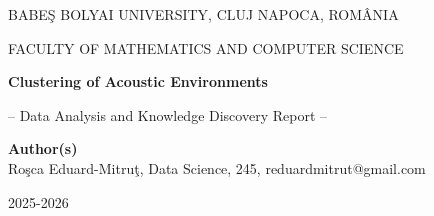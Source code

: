 \documentclass[runningheads,a4paper,11pt]{report}
\begin{document}
\begin{titlepage}
\sloppy

\begin{center}
BABE\c S BOLYAI UNIVERSITY, CLUJ NAPOCA, ROM\^ ANIA

FACULTY OF MATHEMATICS AND COMPUTER SCIENCE

\vspace{6cm}

\Huge \textbf{Clustering of Acoustic Environments}

\vspace{1cm}

\normalsize -- Data Analysis and Knowledge Discovery Report --

\end{center}


\vspace{5cm}

\begin{flushright}
\Large{\textbf{Author(s)}}\\
Ro\c sca Eduard-Mitru\c t, Data Science, 245, reduardmitrut@gmail.com
\end{flushright}

\vspace{4cm}

\begin{center}
2025-2026
\end{center}

\end{titlepage}

\end{document}

